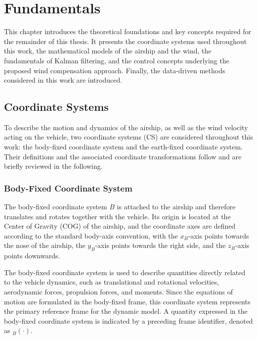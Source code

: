 \chapter{Fundamentals}
\label{chap:2.Fundamentals}
This chapter introduces the theoretical foundations and key concepts required for the remainder of this thesis. It presents the coordinate systems used throughout this work, the mathematical models of the airship and the wind, the fundamentals of Kalman filtering, and the control concepts underlying the proposed wind compensation approach.
Finally, the data-driven methods considered in this work are introduced.




\section{Coordinate Systems}
\label{sec:2.1.CoordinateSystems}


%

To describe the motion and dynamics of the airship, as well as the wind velocity acting on the vehicle, two coordinate systems (CS) are considered throughout this work: the body-fixed coordinate system and the earth-fixed coordinate system. Their definitions and the associated coordinate transformations follow \cite{Fichter2009Flugmechanik} and are briefly reviewed in the following.





\subsection{Body-Fixed Coordinate System}

The body-fixed coordinate system $B$ is attached to the airship and therefore translates and rotates together with the vehicle.
Its origin is located at the Center of Gravity (COG) of the airship, and the coordinate axes are defined according to the standard body-axis convention, with the $x_B$-axis points towards the nose of the airship, the $y_B$-axis points towards the right side, and the $z_B$-axis points downwards.

The body-fixed coordinate system is used to describe quantities directly related to the vehicle dynamics, such as translational and rotational velocities, aerodynamic forces, propulsion forces, and moments. Since the equations of motion are formulated in the body-fixed frame, this coordinate system represents the primary reference frame for the dynamic model. A quantity expressed in the body-fixed coordinate system is indicated by a preceding frame identifier, denoted as ${}_B(\cdot)$.






